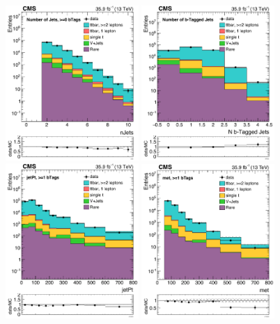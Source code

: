 \begin{figure}[htbp]
\centering
\includegraphics[width=0.45\textwidth]{figures/emuRegion_nJets.pdf}
\includegraphics[width=0.45\textwidth]{figures/emuRegion_nBtags.pdf}
\includegraphics[width=0.45\textwidth]{figures/emuRegion_jetPt.pdf}
\includegraphics[width=0.45\textwidth]{figures/emuRegion_met.pdf}

\end{figure}
